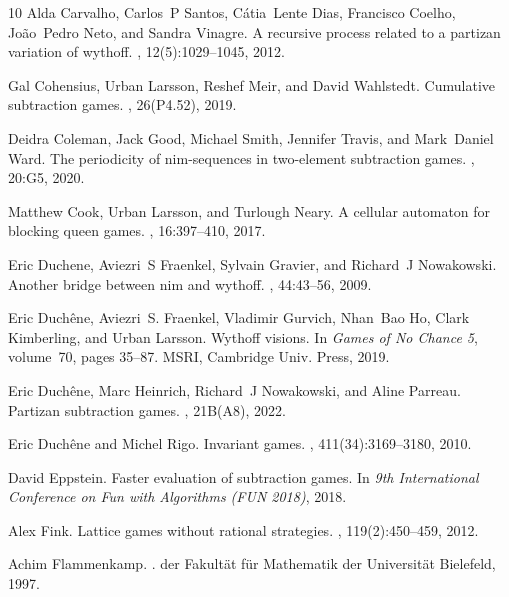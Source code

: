 \documentclass{amsart}
\theoremstyle{plain}
\theoremstyle{definition}
\begin{document}
\begin{thebibliography}{10}
Alda Carvalho, Carlos~P Santos, C{\'a}tia~Lente Dias, Francisco Coelho,
  Jo{\~a}o~Pedro Neto, and Sandra Vinagre.
\newblock A recursive process related to a partizan variation of wythoff.
, 12(5):1029--1045, 2012.

Gal Cohensius, Urban Larsson, Reshef Meir, and David Wahlstedt.
\newblock Cumulative subtraction games.
, 26(P4.52), 2019.

Deidra Coleman, Jack Good, Michael Smith, Jennifer Travis, and Mark~Daniel
  Ward.
\newblock The periodicity of nim-sequences in two-element subtraction games.
, 20:G5, 2020.

Matthew Cook, Urban Larsson, and Turlough Neary.
\newblock A cellular automaton for blocking queen games.
, 16:397--410, 2017.

Eric Duchene, Aviezri~S Fraenkel, Sylvain Gravier, and Richard~J Nowakowski.
\newblock Another bridge between nim and wythoff.
, 44:43--56, 2009.

Eric Duch{\^e}ne, Aviezri~S. Fraenkel, Vladimir Gurvich, Nhan~Bao Ho, Clark
  Kimberling, and Urban Larsson.
\newblock Wythoff visions.
\newblock In {\em Games of No Chance 5}, volume~70, pages 35--87. MSRI,
  Cambridge Univ. Press, 2019.

Eric Duch{\^e}ne, Marc Heinrich, Richard~J Nowakowski, and Aline Parreau.
\newblock Partizan subtraction games.
, 21B(A8), 2022.

Eric Duchêne and Michel Rigo.
\newblock Invariant games.
, 411(34):3169--3180, 2010.

David Eppstein.
\newblock Faster evaluation of subtraction games.
\newblock In {\em 9th International Conference on Fun with Algorithms (FUN
  2018)}, 2018.

Alex Fink.
\newblock Lattice games without rational strategies.
, 119(2):450--459, 2012.

Achim Flammenkamp.
.
\newblock der Fakult\"at f\"ur Mathematik der Universit\"at Bielefeld, 1997.


\end{thebibliography}
\end{document}
